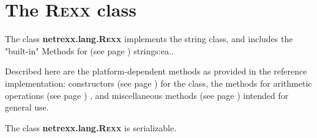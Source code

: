 \chapter{The R\textsc{exx} class}\label{refnlrexx}
 
The class \textbf{netrexx.lang.R\textsc{exx}} implements the \nr{} string
class, and includes the "built-in"  Methods for (see page \pageref{refbmeth}) 
\nr{} strings:ea..
 
Described here are the platform-dependent methods as provided in
the reference implementation:  constructors (see page \pageref{refrexxcon})  for the
class, the methods for  arithmetic operations (see page \pageref{refrexxops}) , and
 miscellaneous methods (see page \pageref{refrexxmis})  intended for general
use.
 
The class \textbf{netrexx.lang.R\textsc{exx}} is serializable.
